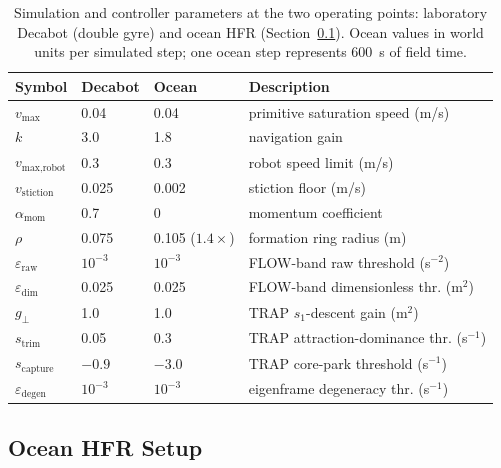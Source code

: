 \documentclass[lettersize,journal]{IEEEtran}
\begin{document}
\begin{table}[!t]
\centering
\caption{Simulation and controller parameters at the two operating
points: laboratory Decabot (double gyre) and ocean HFR
(Section~\ref{sec:ocean_sim}). Ocean values in world units per
simulated step; one ocean step represents 600~s of field time.}
\label{tab:params}
\footnotesize
\setlength{\tabcolsep}{3pt}
\begin{tabular}{llll}
\hline
\textbf{Symbol} & \textbf{Decabot} & \textbf{Ocean} & \textbf{Description} \\
\hline
$v_{\max}$ & 0.04 & 0.04 & primitive saturation speed (m/s) \\
$k$ & 3.0 & 1.8 & navigation gain \\
$v_{\text{max,robot}}$ & 0.3 & 0.3 & robot speed limit (m/s) \\
$v_{\text{stiction}}$ & 0.025 & 0.002 & stiction floor (m/s) \\
$\alpha_{\text{mom}}$ & 0.7 & 0 & momentum coefficient \\
$\rho$ & 0.075 & 0.105 ($1.4\times$) & formation ring radius (m) \\
$\varepsilon_{\text{raw}}$ & $10^{-3}$ & $10^{-3}$ & FLOW-band raw threshold (s$^{-2}$) \\
$\varepsilon_{\text{dim}}$ & 0.025 & 0.025 & FLOW-band dimensionless thr. (m$^2$) \\
$g_\perp$ & 1.0 & 1.0 & TRAP $s_1$-descent gain (m$^2$) \\
$s_{\text{trim}}$ & 0.05 & 0.3 & TRAP attraction-dominance thr. (s$^{-1}$) \\
$s_{\text{capture}}$ & $-0.9$ & $-3.0$ & TRAP core-park threshold (s$^{-1}$) \\
$\varepsilon_{\text{degen}}$ & $10^{-3}$ & $10^{-3}$ & eigenframe degeneracy thr. (s$^{-1}$) \\
\hline
\end{tabular}
\end{table}

\subsection{Ocean HFR Setup}
\label{sec:ocean_sim}
\end{document}
